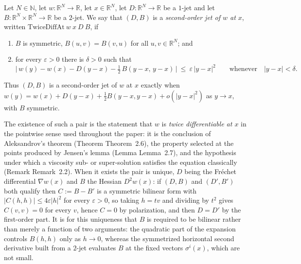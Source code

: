 \begin{definition}
Let $N\in\mathbb N$, let $w:\mathbb R^N\to\mathbb R$, let $x\in\mathbb R^N$, let
$D:\mathbb R^N\to\mathbb R$ be a $1$-jet and let $B:\mathbb R^N\times\mathbb R^N\to\mathbb R$
be a $2$-jet. We say that $(D,B)$ is a \emph{second-order jet of $w$ at $x$}, written
$\mathrm{TwiceDiffAt}\ w\ x\ D\ B$, if
\begin{enumerate}
\item $B$ is symmetric, $B(u,v)=B(v,u)$ for all $u,v\in\mathbb R^N$; and
\item for every $\varepsilon>0$ there is $\delta>0$ such that
\[
 \Big|\,w(y)-w(x)-D(y-x)-\tfrac12\,B(y-x,\,y-x)\,\Big|\ \le\ \varepsilon\,|y-x|^2
 \qquad\text{whenever}\quad |y-x|<\delta .
\]
\end{enumerate}
Thus $(D,B)$ is a second-order jet of $w$ at $x$ exactly when
$w(y)=w(x)+D(y-x)+\tfrac12 B(y-x,y-x)+o(|y-x|^2)$ as $y\to x$, with $B$ symmetric.

The existence of such a pair is the statement that $w$ is \emph{twice differentiable at
$x$} in the pointwise sense used throughout the paper: it is the conclusion of
Aleksandrov's theorem (Theorem Theorem~2.6), the property selected at the points
produced by Jensen's lemma (Lemma Lemma~2.7), and the hypothesis under which a viscosity
sub- or super-solution satisfies the equation classically (Remark Remark~2.2). When it
exists the pair is unique, $D$ being the Fr\'echet differential $\nabla w(x)$ and $B$ the
Hessian $D^2w(x)$: if $(D,B)$ and $(D',B')$ both qualify then $C:=B-B'$ is a symmetric
bilinear form with $|C(h,h)|\le4\varepsilon|h|^2$ for every $\varepsilon>0$, so taking
$h=tv$ and dividing by $t^2$ gives $C(v,v)=0$ for every $v$, hence $C=0$ by polarization,
and then $D=D'$ by the first-order part. It is for this uniqueness that $B$ is required to
be bilinear rather than merely a function of two arguments: the quadratic part of the
expansion controls $B(h,h)$ only as $h\to0$, whereas the symmetrized horizontal second
derivative built from a $2$-jet evaluates $B$ at the fixed vectors $\sigma^i(x)$, which
are not small.
\end{definition}
